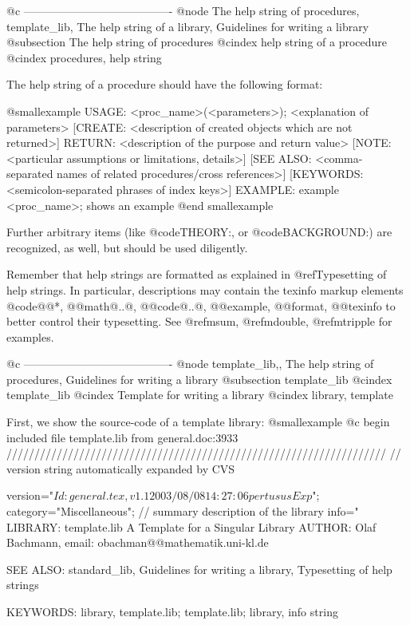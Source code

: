 {{{{@c ----------------------------------------
@node The help string of procedures, template_lib, The help string of a library, Guidelines for writing a library
@subsection The help string of procedures
@cindex help string of a procedure
@cindex procedures, help string

The help string of a procedure should have the following format:

@smallexample
USAGE:    <proc_name>(<parameters>);   <explanation of parameters>
[CREATE:  <description of created objects which are not returned>]
RETURN:   <description of the purpose and return value>
[NOTE:    <particular assumptions or limitations, details>]
[SEE ALSO: <comma-separated names of related procedures/cross references>]
[KEYWORDS: <semicolon-separated phrases of index keys>]
EXAMPLE:  example <proc_name>; shows an example
@end smallexample

Further arbitrary items (like @code{THEORY:}, or @code{BACKGROUND:}) are
recognized, as well, but should be used diligently.

Remember that help strings are formatted as explained in
@ref{Typesetting of help strings}. In particular, descriptions may
contain the texinfo markup elements @code{@@*, @@math@{..@},
@@code@{..@}, @@example, @@format, @@texinfo} to better control their
typesetting. See @ref{msum}, @ref{mdouble}, @ref{mtripple} for examples.

@c ----------------------------------------
@node template_lib,, The help string of procedures, Guidelines for writing a library
@subsection template_lib
@cindex template_lib
@cindex Template for writing a library
@cindex library, template

First, we show the source-code of a template library:
@smallexample
@c begin included file template.lib from general.doc:3933
////////////////////////////////////////////////////////////////////
// version string automatically expanded by CVS

version="$Id: general.tex,v 1.1 2003/08/08 14:27:06 pertusus Exp $";
category="Miscellaneous";
// summary description of the library
info="
LIBRARY:   template.lib  A Template for a Singular Library
AUTHOR:    Olaf Bachmann, email: obachman@@mathematik.uni-kl.de

SEE ALSO:  standard_lib, Guidelines for writing a library,
           Typesetting of help strings

KEYWORDS: library, template.lib; template.lib; library, info string

}}}}
